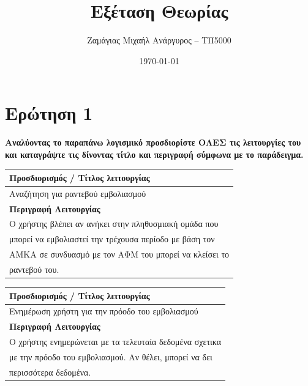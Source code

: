 \documentclass[12pt]{turabian-researchpaper}
\title{Εξέταση Θεωρίας}
\author{Ζαμάγιας Μιχαήλ Ανάργυρος -- ΤΠ5000}
\date{\today}
\begin{document}
\begin{titlepage}
    \maketitle
\end{titlepage}

\tableofcontents

\newpage

\section{Ερώτηση 1}
\textbf{Αναλύοντας το παραπάνω λογισμικό προσδιορίστε ΟΛΕΣ τις λειτουργίες του και καταγράψτε τις δίνοντας τίτλο και περιγραφή σύμφωνα με το παράδειγμα.}

\begin{center}

    \begin{table}
        \centering
        \begin{tabular}{|l|}
            \hline
            \textbf{Προσδιορισμός / Τίτλος λειτουργίας}            \\ \hline
            Αναζήτηση για ραντεβού εμβολιασμού                     \\ \hline
            \textbf{Περιγραφή Λειτουργίας}                         \\ \hline
            Ο χρήστης βλέπει αν ανήκει στην πληθυσμιακή ομάδα που  \\
            μπορεί να εμβολιαστεί την τρέχουσα περίοδο με βάση τον \\
            ΑΜΚΑ σε συνδυασμό με τον ΑΦΜ του μπορεί να κλείσει το  \\
            ραντεβού του.                                          \\ \hline
        \end{tabular}
    \end{table}

    \begin{table}
        \centering
        \begin{tabular}{|l|}
            \hline
            \textbf{Προσδιορισμός / Τίτλος λειτουργίας}             \\ \hline
            Ενημέρωση χρήστη για την πρόοδο του εμβολιασμού         \\ \hline
            \textbf{Περιγραφή Λειτουργίας}                          \\ \hline
            Ο χρήστης ενημερώνεται με τα τελευταία δεδομένα σχετικα \\
            με την πρόοδο του εμβολιασμού. Αν θέλει, μπορεί να δει  \\
            περισσότερα δεδομένα.                                   \\ \hline
        \end{tabular}
    \end{table}


\end{center}
\end{document}
